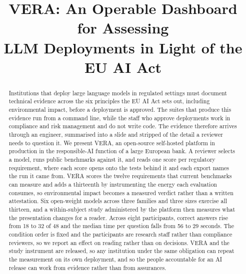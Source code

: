 \documentclass[10pt,conference]{IEEEtran}
\begin{document}
\title{VERA: An Operable Dashboard for Assessing\\ LLM Deployments in Light of the EU AI Act}

\author{%
}

\maketitle

\begin{abstract}
Institutions that deploy large language models in regulated settings must document technical evidence across the six principles the EU AI Act sets out, including environmental impact, before a deployment is approved.
The suites that produce this evidence run from a command line, while the staff who approve deployments work in compliance and risk management and do not write code.
The evidence therefore arrives through an engineer, summarised into a slide and stripped of the detail a reviewer needs to question it.
We present VERA, an open-source self-hosted platform in production in the responsible-AI function of a large European bank.
A reviewer selects a model, runs public benchmarks against it, and reads one score per regulatory requirement, where each score opens onto the tests behind it and each export names the run it came from.
VERA scores the twelve requirements that current benchmarks can measure and adds a thirteenth by instrumenting the energy each evaluation consumes, so environmental impact becomes a measured verdict rather than a written attestation.
Six open-weight models across three families and three sizes exercise all thirteen, and a within-subject study administered by the platform then measures what the presentation changes for a reader.
Across eight participants, correct answers rise from 18 to 32 of 48 and the median time per question falls from 56 to 29 seconds.
The condition order is fixed and the participants are research staff rather than compliance reviewers, so we report an effect on reading rather than on decisions.
VERA and the study instrument are released, so any institution under the same obligation can repeat the measurement on its own deployment, and so the people accountable for an AI release can work from evidence rather than from assurances.
\end{abstract}
\end{document}
